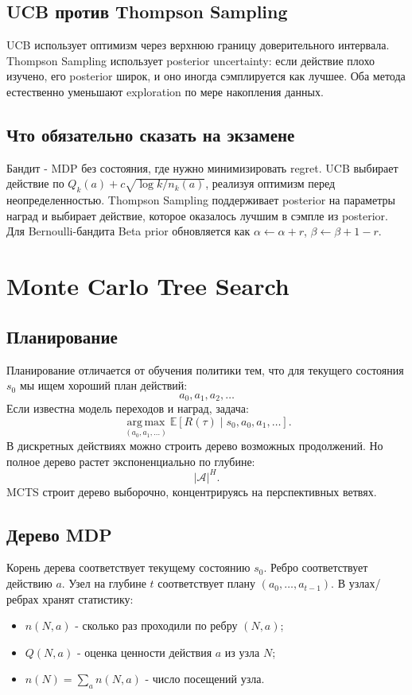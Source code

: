 \documentclass[11pt,a4paper]{article}
\newcommand{\E}{\mathbb{E}}
\newcommand{\argmax}{\operatorname*{arg\,max}}
\newcommand{\1}{\mathbf{1}}
\newcommand{\cA}{\mathcal A}
\begin{document}
\subsection*{UCB против Thompson Sampling}
UCB использует оптимизм через верхнюю границу доверительного интервала. Thompson Sampling использует posterior uncertainty: если действие плохо изучено, его posterior широк, и оно иногда сэмплируется как лучшее. Оба метода естественно уменьшают exploration по мере накопления данных.

\subsection*{Что обязательно сказать на экзамене}
Бандит - MDP без состояния, где нужно минимизировать regret. UCB выбирает действие по $Q_k(a)+c\sqrt{\log k/n_k(a)}$, реализуя оптимизм перед неопределенностью. Thompson Sampling поддерживает posterior на параметры наград и выбирает действие, которое оказалось лучшим в сэмпле из posterior. Для Bernoulli-бандита Beta prior обновляется как $\alpha\leftarrow\alpha+r$, $\beta\leftarrow\beta+1-r$.

\newpage
\section{Monte Carlo Tree Search}

\subsection*{Планирование}
Планирование отличается от обучения политики тем, что для текущего состояния $s_0$ мы ищем хороший план действий:
\[
    a_0,a_1,a_2,\dots
\]
Если известна модель переходов и наград, задача:
\[
    \argmax_{(a_0,a_1,\dots)}
    \E\left[R(\tau)\mid s_0,a_0,a_1,\dots\right].
\]
В дискретных действиях можно строить дерево возможных продолжений. Но полное дерево растет экспоненциально по глубине:
\[
    |\cA|^H.
\]
MCTS строит дерево выборочно, концентрируясь на перспективных ветвях.

\subsection*{Дерево MDP}
Корень дерева соответствует текущему состоянию $s_0$. Ребро соответствует действию $a$. Узел на глубине $t$ соответствует плану $(a_0,\dots,a_{t-1})$. В узлах/ребрах хранят статистику:
\begin{itemize}
    \item $n(N,a)$ - сколько раз проходили по ребру $(N,a)$;
    \item $Q(N,a)$ - оценка ценности действия $a$ из узла $N$;
    \item $n(N)=\sum_a n(N,a)$ - число посещений узла.
\end{itemize}
\end{document}
